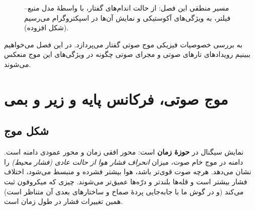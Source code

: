 \begin{figure}[htbp]
\centering
{}
\caption{مسیر منطقی این فصل: از حالت اندام‌های گفتار، با واسطهٔ مدل منبع--فیلتر، به ویژگی‌های آکوستیکی و نمایش آن‌ها در اسپکتروگرام می‌رسیم (شکل افزوده).}
\end{figure}

 به بررسی خصوصیات فیزیکی موج صوتی گفتار می‌پردازد. در این فصل می‌خواهیم ببینیم رویدادهای تارهای صوتی و مجرای صوتی چگونه در ویژگی‌های این موج منعکس می‌شوند.

\section{موج صوتی، فرکانس پایه و زیر و بمی}

\subsection{شکل موج}
 نمایش سیگنال در \textbf{حوزهٔ زمان} است: محور افقی زمان و محور عمودی دامنه است. دامنه در موج خام صوت، میزان \emph{انحراف فشار هوا از حالت عادی (فشار محیط)} را نشان می‌دهد. هرچه صوت قوی‌تر باشد، هوا بیشتر فشرده و منبسط می‌شود، اختلاف فشار بیشتر است و قله‌ها بلندتر و درّه‌ها عمیق‌تر می‌شوند. چیزی که میکروفون ثبت می‌کند (و در گوش ما با جابه‌جایی پردهٔ صماخ و ساختارهای بعدی آن متناظر است) همین تغییرات فشار در طول زمان است.


